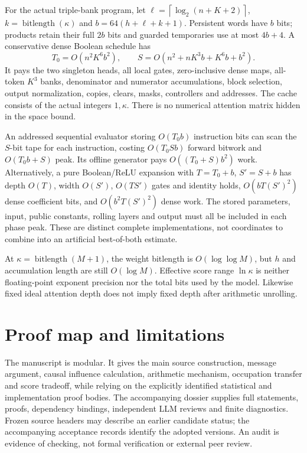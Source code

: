 \documentclass[11pt,letterpaper]{article}
\theoremstyle{definition}\newtheorem{definition}[theorem]{Definition}
\theoremstyle{remark}\newtheorem{remark}[theorem]{Remark}
\newcommand{\ceil}[1]{\left\lceil #1\right\rceil}
\newcommand{\bl}{\operatorname{bitlength}}
\begin{document}
For the actual triple-bank program, let $\ell=\ceil{\log_2(n+K+2)}$, $k=\bl(\kappa)$ and $b=64(h+\ell+k+1)$. Persistent words have $b$ bits; products retain their full $2b$ bits and guarded temporaries use at most $4b+4$. A conservative dense Boolean schedule has
\begin{equation}\label{eq:costtriple}
 T_0=O(n^2K^6b^2),\qquad
 S=O(n^2+nK^3b+K^6b+b^2).
\end{equation}
It pays the two singleton heads, all local gates, zero-inclusive dense maps, all-token $K^3$ banks, denominator and numerator accumulations, block selection, output normalization, copies, clears, masks, controllers and addresses. The cache consists of the actual integers $1,\kappa$. There is no numerical attention matrix hidden in the space bound.

An addressed sequential evaluator storing $O(T_0b)$ instruction bits can scan the $S$-bit tape for each instruction, costing $O(T_0Sb)$ forward bitwork and $O(T_0b+S)$ peak. Its offline generator pays $O((T_0+S)b^2)$ work. Alternatively, a pure Boolean/ReLU expansion with $T=T_0+b$, $S'=S+b$ has depth $O(T)$, width $O(S')$, $O(TS')$ gates and identity holds, $O(bT(S')^2)$ dense coefficient bits, and $O(b^2T(S')^2)$ dense work. The stored parameters, input, public constants, rolling layers and output must all be included in each phase peak. These are distinct complete implementations, not coordinates to combine into an artificial best-of-both estimate.

At $\kappa=\bl(M+1)$, the weight bitlength is $O(\log\log M)$, but $h$ and accumulation length are still $O(\log M)$. Effective score range $\ln\kappa$ is neither floating-point exponent precision nor the total bits used by the model. Likewise fixed ideal attention depth does not imply fixed depth after arithmetic unrolling.

\section{Proof map and limitations}\label{sec:map}
The manuscript is modular. It gives the main source construction, message argument, causal influence calculation, arithmetic mechanism, occupation transfer and score tradeoff, while relying on the explicitly identified statistical and implementation proof bodies. The accompanying dossier supplies full statements, proofs, dependency bindings, independent LLM reviews and finite diagnostics. Frozen source headers may describe an earlier candidate status; the accompanying acceptance records identify the adopted versions. An audit is evidence of checking, not formal verification or external peer review.
\end{document}
